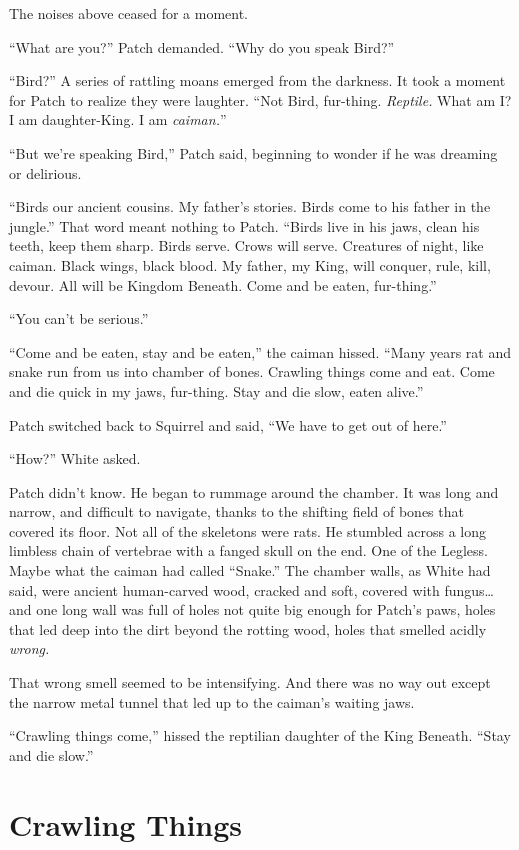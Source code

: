 \documentclass[ebook,oneside,openany,12pt]{memoir}
\begin{document}
The noises above ceased for a moment.

“What are you?” Patch demanded. “Why do you speak Bird?”

“Bird?” A series of rattling moans emerged from the darkness. It took
a moment for Patch to realize they were laughter. “Not Bird,
fur-thing. \emph{Reptile.} What am I? I am daughter-King. I am
\emph{caiman.}”

“But we’re speaking Bird,” Patch said, beginning to wonder if he was
dreaming or delirious.

“Birds our ancient cousins. My father’s stories. Birds come to his
father in the jungle.” That word meant nothing to Patch. “Birds live
in his jaws, clean his teeth, keep them sharp. Birds serve. Crows will
serve. Creatures of night, like caiman. Black wings, black blood. My
father, my King, will conquer, rule, kill, devour. All will be Kingdom
Beneath. Come and be eaten, fur-thing.”

“You can’t be serious.”

“Come and be eaten, stay and be eaten,” the caiman hissed. “Many years
rat and snake run from us into chamber of bones. Crawling things come
and eat. Come and die quick in my jaws, fur-thing. Stay and die slow,
eaten alive.”

Patch switched back to Squirrel and said, “We have to get out of
here.”

“How?” White asked.

Patch didn’t know. He began to rummage around the chamber. It was long
and narrow, and difficult to navigate, thanks to the shifting field of
bones that covered its floor. Not all of the skeletons were rats. He
stumbled across a long limbless chain of vertebrae with a fanged skull
on the end. One of the Legless. Maybe what the caiman had called
“Snake.” The chamber walls, as White had said, were ancient
human-carved wood, cracked and soft, covered with fungus… and one long
wall was full of holes not quite big enough for Patch’s paws, holes
that led deep into the dirt beyond the rotting wood, holes that
smelled acidly \emph{wrong.}

That wrong smell seemed to be intensifying. And there was no way out
except the narrow metal tunnel that led up to the caiman’s waiting
jaws.

“Crawling things come,” hissed the reptilian daughter of the King
Beneath. “Stay and die slow.”


\section{Crawling Things}
\end{document}
